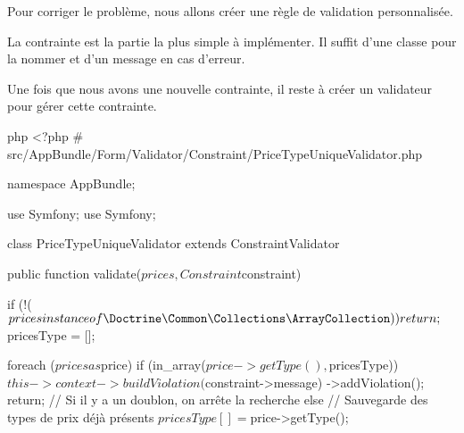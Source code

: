 \documentclass[big]{zmdocument}
\begin{document}
Pour corriger le problème, nous allons créer une règle de validation personnalisée.







La contrainte est la partie la plus simple à implémenter. Il suffit d'une classe pour la nommer et d'un message en cas d'erreur.








Une fois que nous avons une nouvelle contrainte, il reste à créer un validateur pour gérer cette contrainte.



\begin{CodeBlock}{php}
<?php
# src/AppBundle/Form/Validator/Constraint/PriceTypeUniqueValidator.php

namespace AppBundle\Form\Validator\Constraint;

use Symfony\Component\Validator\Constraint;
use Symfony\Component\Validator\ConstraintValidator;

class PriceTypeUniqueValidator extends ConstraintValidator
{
    public function validate($prices, Constraint $constraint)
    {
        if (!($prices instanceof \Doctrine\Common\Collections\ArrayCollection)) {
            return;
        }

        $pricesType = [];

        foreach ($prices as $price) {
            if (in_array($price->getType(), $pricesType)) {
                $this->context->buildViolation($constraint->message)
                    ->addViolation();
                return; // Si il y a un doublon, on arrête la recherche
            } else {
                // Sauvegarde des types de prix déjà présents
                $pricesType[] = $price->getType();
            }
        }
    }
}
\end{CodeBlock}
\end{document}
